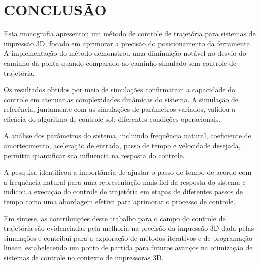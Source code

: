 \chapter{CONCLUSÃO}
Esta monografia apresentou um método de controle de trajetória para sistemas de impressão 3D, focado em aprimorar a precisão do posicionamento da ferramenta. A implementação do método demonstrou uma diminuição notável no desvio do caminho da ponta quando comparado ao caminho simulado sem controle de trajetória.

Os resultados obtidos por meio de simulações confirmaram a capacidade do controle em atenuar as complexidades dinâmicas do sistema. A simulação de referência, juntamente com as simulações de parâmetros variados, validou a eficácia do algoritmo de controle sob diferentes condições operacionais.

A análise dos parâmetros do sistema, incluindo frequência natural, coeficiente de amortecimento, aceleração de entrada, passo de tempo e velocidade desejada, permitiu quantificar sua influência na resposta do controle.

A pesquisa identificou a importância de ajustar o passo de tempo de acordo com a frequência natural para uma representação mais fiel da resposta do sistema e indicou a execução do controle de trajetória em etapas de diferentes passos de tempo como uma abordagem efetiva para aprimorar o processo de controle.

Em síntese, as contribuições deste trabalho para o campo do controle de trajetória são evidenciadas pela melhoria na precisão da impressão 3D dada pelas simulações e contribui para a exploração de métodos iterativos e de programação linear, estabelecendo um ponto de partida para futuros avanços na otimização de sistemas de controle no contexto de impressoras 3D.